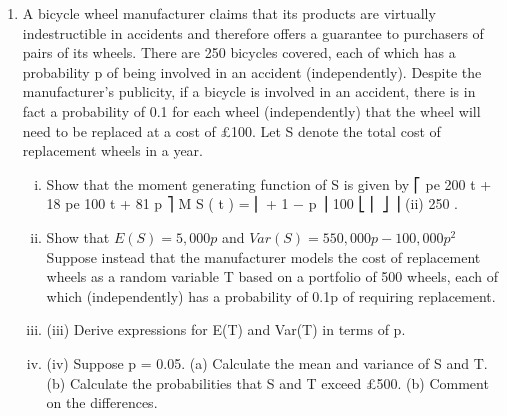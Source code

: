 \documentclass[a4paper,12pt]{article}
\begin{document}
\begin{enumerate}
\item A bicycle wheel manufacturer claims that its products are virtually indestructible in
accidents and therefore offers a guarantee to purchasers of pairs of its wheels. There
are 250 bicycles covered, each of which has a probability p of being involved in an
accident (independently). Despite the manufacturer’s publicity, if a bicycle is
involved in an accident, there is in fact a probability of 0.1 for each wheel
(independently) that the wheel will need to be replaced at a cost of £100. Let S denote
the total cost of replacement wheels in a year.

\begin{enumerate}[(i)]
\item Show that the moment generating function of S is given by
⎡ pe 200 t + 18 pe 100 t + 81 p
⎤
M S ( t ) = ⎢
+ 1 − p ⎥
100
⎣ ⎢
⎦ ⎥
(ii)
250
.
\item Show that $E ( S ) = 5, 000 p$ and $Var ( S ) = 550, 000 p − 100, 000 p^2$
Suppose instead that the manufacturer models the cost of replacement wheels as a random variable T based on a portfolio of 500 wheels, each of which (independently) has a probability of 0.1p of requiring replacement.
\item (iii) Derive expressions for E(T) and Var(T) in terms of p.
\item (iv) Suppose p = 0.05.
(a) Calculate the mean and variance of S and T.
(b) Calculate the probabilities that S and T exceed £500.
(b) Comment on the differences.



\end{enumerate}
\end{enumerate}
\end{document}
